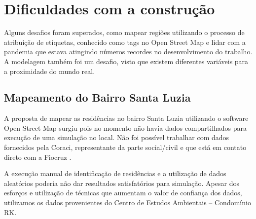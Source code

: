 \section{Dificuldades com a construção}

Alguns desafios foram superados, como mapear regiões utilizando o processo de atribuição de etiquetas, conhecido como tags no Open Street Map e lidar com a pandemia que estava atingindo números recordes no desenvolvimento do trabalho. A modelagem também foi um desafio, visto que existem diferentes variáveis para a proximidade do mundo real.

\subsection{Mapeamento do Bairro Santa Luzia}

A proposta de mapear as residências no bairro Santa Luzia utilizando o software Open Street Map surgiu pois no momento não havia dados compartilhados para execução de uma simulação no local. Não foi possível trabalhar com dados fornecidos pela Coraci, representante da parte social/civil e que está em contato direto com a Fiocruz \cite{silva2020estudo}.

A execução manual de identificação de residências e a utilização de dados aleatórios poderia não dar resultados satisfatórios para simulação. Apesar dos esforços e utilização de técnicas que aumentam o valor de confiança dos dados, utilizamos os dados provenientes do Centro de Estudos Ambientais – Condomínio RK.
